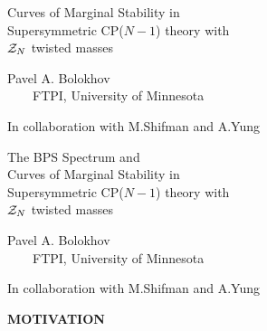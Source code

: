 \documentclass[12pt,letterpaper,landscape,KOMA,smallheadings,calcdimensions,display]{powersem}
\begin{document}
\begin{slide}

\begin{center}

\vspace*{1.7cm}
{\Large Curves of Marginal Stability in\\[2mm]
    Supersymmetric CP($N-1$) theory with\\[3.5mm]
	$ \mathcal{Z}_N $ twisted masses}

\vspace{1.4cm}

{Pavel A. Bolokhov\\
\small
~~~~FTPI, University of Minnesota}

{\small In collaboration with M.Shifman and A.Yung}

\end{center}

\end{slide}


\begin{slide}

\begin{center}

\vspace*{0.58cm}
{\Large    The BPS Spectrum and\\[2mm]
	Curves of Marginal Stability in\\[2mm]
    Supersymmetric CP($N-1$) theory with\\[3.5mm]
	$ \mathcal{Z}_N $ twisted masses}

\vspace{1.4cm}

{Pavel A. Bolokhov\\
\small
~~~~FTPI, University of Minnesota}

{\small In collaboration with M.Shifman and A.Yung}

\end{center}

\end{slide}



\begin{slide}

\vspace*{3.0cm} 
\begin{center}
\fontsize{45pt}{30pt}\selectfont
\bfseries
	MOTIVATION
\end{center}
\vspace*{2.0cm} 


\end{slide}
\end{document}
